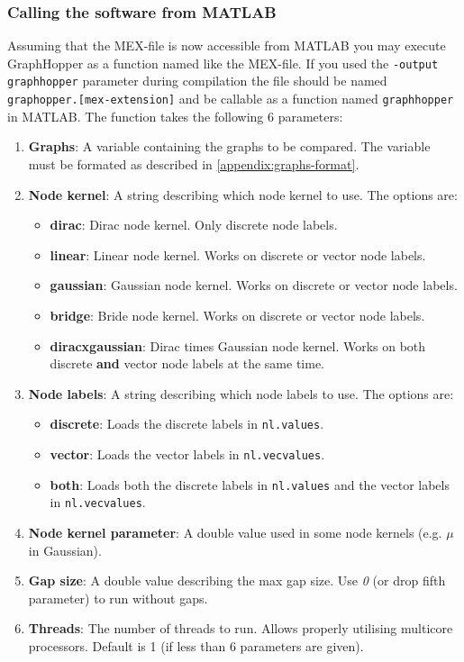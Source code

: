 \documentclass{article}
\begin{document}
\begin{appendices}
\subsubsection{Calling the software from MATLAB}
Assuming that the MEX-file is now accessible from MATLAB you may execute GraphHopper as a function named like the MEX-file. If you used the \verb|-output graphhopper| parameter during compilation the file should be named \verb|graphopper.[mex-extension]| and be callable as a function named \verb|graphhopper| in MATLAB. The function takes the following 6 parameters:
\begin{enumerate}
	\item \textbf{Graphs}: A variable containing the graphs to be compared. The variable must be formated as described in \ref{appendix:graphs-format}.
	\item \textbf{Node kernel}: A string describing which node kernel to use. The options are:
	\begin{itemize}
		\item \textbf{dirac}: Dirac node kernel. Only discrete node labels.
		\item \textbf{linear}: Linear node kernel. Works on discrete or vector node labels.
		\item \textbf{gaussian}: Gaussian node kernel. Works on discrete or vector node labels.
		\item \textbf{bridge}: Bride node kernel. Works on discrete or vector node labels.
		\item \textbf{diracxgaussian}: Dirac times Gaussian node kernel. Works on both discrete \textbf{and} vector node labels at the same time.
	\end{itemize}
	\item \textbf{Node labels}: A string describing which node labels to use. The options are:
	\begin{itemize}
		\item \textbf{discrete}: Loads the discrete labels in \verb|nl.values|.
		\item \textbf{vector}: Loads the vector labels in \verb|nl.vecvalues|.
		\item \textbf{both}: Loads both the discrete labels in \verb|nl.values| and the vector labels in \verb|nl.vecvalues|.
	\end{itemize}
	\item \textbf{Node kernel parameter}: A double value used in some node kernels (e.g. $\mu$ in Gaussian).
	\item \textbf{Gap size}: A double value describing the max gap size. Use \textit{0} (or drop fifth parameter) to run without gaps.
	\item \textbf{Threads}: The number of threads to run. Allows properly utilising multicore processors. Default is 1 (if less than 6 parameters are given).
\end{enumerate}


\end{appendices}
\end{document}
